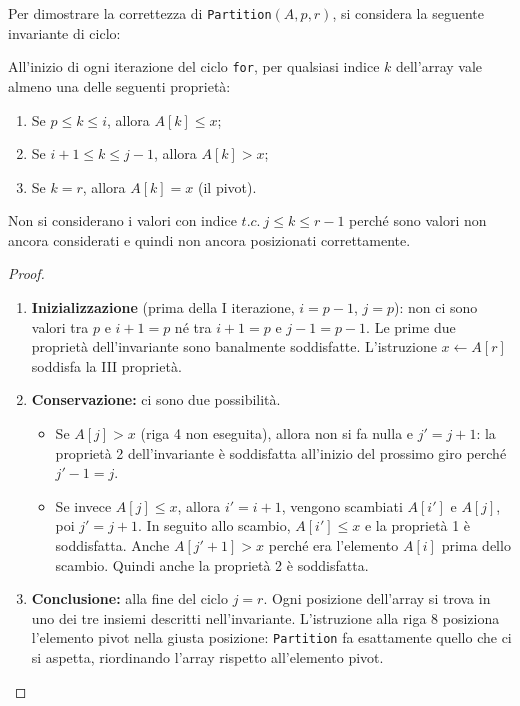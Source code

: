 Per dimostrare la correttezza di \texttt{Partition}$(A, p, r)$,
si considera la seguente invariante di ciclo:

\begin{definizione}
	All'inizio di ogni iterazione del ciclo \texttt{for}, per qualsiasi
	indice $k$ dell'array vale almeno una delle seguenti proprietà:
	\begin{enumerate}
		\item Se $p \le k \le i$, allora $A[k] \le x$;
		\item Se $i+1 \le k \le j-1$, allora $A[k] > x$;
		\item Se $k = r$, allora $A[k] = x$ (il pivot).
	\end{enumerate}
\end{definizione}

\begin{nota}
	Non si considerano i valori con indice $t.c.\ j \le k \le r-1$
	perché sono valori non ancora considerati e quindi non ancora
	posizionati correttamente.
\end{nota}

\begin{proof}
	\begin{enumerate}
		\item \textbf{Inizializzazione} (prima della I iterazione, $i=p-1$,
		$j=p$): non ci sono valori tra $p$ e $i+1 = p$ né tra $i+1=p$
		e $j-1=p-1$. Le prime due proprietà dell'invariante sono
		banalmente soddisfatte. L'istruzione $x \gets A[r]$ soddisfa
		la III proprietà. \checkmark
		
		\item \textbf{Conservazione:} ci sono due possibilità.
		\begin{itemize}
			\item Se $A[j] > x$ (riga 4 non eseguita), allora non si fa
			nulla e $j' = j+1$: la proprietà 2 dell'invariante è
			soddisfatta all'inizio del prossimo giro perché $j' - 1 = j$.
			\item Se invece $A[j] \le x$, allora $i' = i+1$, vengono
			scambiati $A[i']$ e $A[j]$, poi $j' = j+1$. In seguito
			allo scambio, $A[i'] \le x$ e la proprietà 1 è soddisfatta.
			Anche $A[j'+1] > x$ perché era l'elemento $A[i]$ prima
			dello scambio. Quindi anche la proprietà 2 è soddisfatta.
		\end{itemize}
		
		\item \textbf{Conclusione:} alla fine del ciclo $j = r$. Ogni
		posizione dell'array si trova in uno dei tre insiemi descritti
		nell'invariante. L'istruzione alla riga 8 posiziona l'elemento
		pivot nella giusta posizione: \texttt{Partition} fa esattamente
		quello che ci si aspetta, riordinando l'array rispetto
		all'elemento pivot.
	\end{enumerate}
\end{proof}

